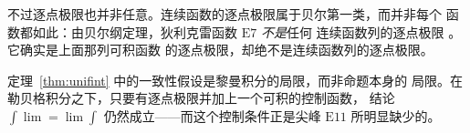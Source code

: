 \begin{remark}
不过逐点极限也并非任意。连续函数的逐点极限属于贝尔第一类，而并非每个
函数都如此：由贝尔纲定理，狄利克雷函数 $\mathrm{E}7$ \emph{不是}任何
连续函数列的逐点极限 \cite[第 28 讲]{yupin}。它确实是上面那列可积函数
的逐点极限，却绝不是连续函数列的逐点极限。
\end{remark}

\begin{remark}
定理~\ref{thm:unifint} 中的一致性假设是黎曼积分的局限，而非命题本身的
局限。在勒贝格积分之下，只要有逐点极限并加上一个可积的控制函数，
结论 $\int \lim = \lim \int$ 仍然成立——而这个控制条件正是尖峰
$\mathrm{E}11$ 所明显缺少的。
\end{remark}
